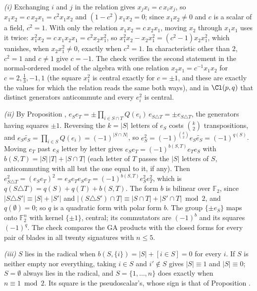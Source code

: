 \emph{(i)} Exchanging $i$ and $j$ in the relation gives $x_{j}x_{i} = c\,x_{i}x_{j}$, so $x_{1}x_{2} = c\,x_{2}x_{1} = c^{2}x_{1}x_{2}$ and $(1 - c^{2})x_{1}x_{2} = 0$; since $x_{1}x_{2} \ne 0$ and $c$ is a scalar of a field, $c^{2} = 1$. With only the relation $x_{1}x_{2} = c\,x_{2}x_{1}$, moving $x_{2}$ through $x_{1}x_{1}$ uses it twice: $x_{1}^{2}x_{2} = c\,x_{1}x_{2}x_{1} = c^{2}x_{2}x_{1}^{2}$, so $x_{1}^{2}x_{2} - x_{2}x_{1}^{2} = (c^{2} - 1)x_{2}x_{1}^{2}$, which vanishes, when $x_{2}x_{1}^{2} \ne 0$, exactly when $c^{2} = 1$. In characteristic other than $2$, $c^{2} = 1$ and $c \ne 1$ give $c = -1$. The check verifies the second statement in the normal-ordered model of the algebra with one relation $x_{2}x_{1} = c^{-1}x_{1}x_{2}$ for $c = 2, \tfrac13, -1, 1$ (the square $x_{1}^{2}$ is central exactly for $c = \pm 1$, and these are exactly the values for which the relation reads the same both ways), and in $\Cl(p,q)$ that distinct generators anticommute and every $e_{i}^{2}$ is central.

\emph{(ii)} By Proposition , $e_{S}e_{T} = \pm \prod_{i \in S \cap T} Q(e_{i})\, e_{S \triangle T} = \pm e_{S \triangle T}$, the generators having squares $\pm 1$. Reversing the $k = |S|$ letters of $e_{S}$ costs $\binom{k}{2}$ transpositions, and $e_{S}\widetilde{e_{S}} = \prod_{i \in S}Q(e_{i}) = (-1)^{|S \cap N|}$, so $e_{S}^{2} = (-1)^{\binom{k}{2}}e_{S}\widetilde{e_{S}} = (-1)^{q(S)}$. Moving $e_{T}$ past $e_{S}$ letter by letter gives $e_{S}e_{T} = (-1)^{b(S,T)}e_{T}e_{S}$ with $b(S,T) = |S|\,|T| + |S \cap T|$ (each letter of $T$ passes the $|S|$ letters of $S$, anticommuting with all but the one equal to it, if any). Then $e_{S \triangle T}^{2} = (e_{S}e_{T})^{2} = e_{S}e_{T}e_{S}e_{T} = (-1)^{b(S,T)}e_{S}^{2}e_{T}^{2}$, which is $q(S \triangle T) = q(S) + q(T) + b(S,T)$. The form $b$ is bilinear over $\mathbb{F}_{2}$, since $|S \triangle S'| \equiv |S| + |S'|$ and $|(S \triangle S') \cap T| \equiv |S \cap T| + |S' \cap T| \bmod 2$, and $q(\emptyset) = 0$; so $q$ is a quadratic form with polar form $b$. The group $\{\pm e_{S}\}$ maps onto $\mathbb{F}_{2}^{n}$ with kernel $\{\pm 1\}$, central; its commutators are $(-1)^{b}$ and its squares $(-1)^{q}$. The check compares the GA products with the closed forms for every pair of blades in all twenty signatures with $n \le 5$.

\emph{(iii)} $S$ lies in the radical when $b(S, \{i\}) = |S| + [i \in S] = 0$ for every $i$. If $S$ is neither empty nor everything, taking $i \in S$ and $i' \notin S$ gives $|S| \equiv 1$ and $|S| \equiv 0$; $S = \emptyset$ always lies in the radical, and $S = \{1, \dots, n\}$ does exactly when $n \equiv 1 \bmod 2$. Its square is the pseudoscalar's, whose sign is that of Proposition .

